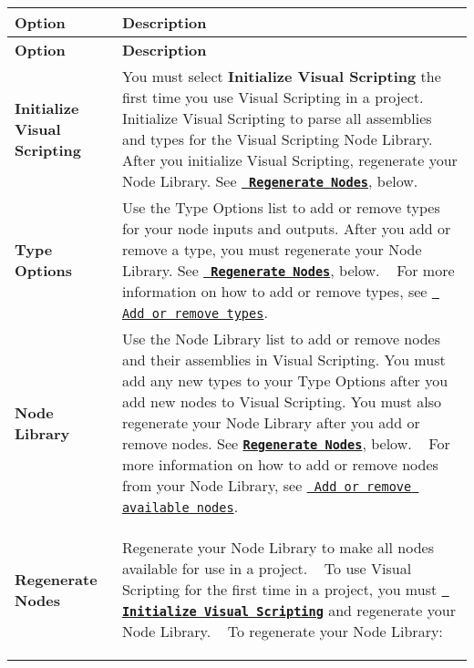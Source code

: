 \tabulinesep=1mm
\begin{longtabu}spread 0pt [c]{*{2}{|X[-1]}|}
\hline
\cellcolor{\tableheadbgcolor}\textbf{ {\bfseries{Option}} }&\cellcolor{\tableheadbgcolor}\textbf{ Description    }\\
\endfirsthead
\hline
\endfoot
\hline
\cellcolor{\tableheadbgcolor}\textbf{ {\bfseries{Option}} }&\cellcolor{\tableheadbgcolor}\textbf{ Description    }\\
\endhead
{\bfseries{\label{md__library_2_package_cache_2com_8unity_8visualscripting_0d1_89_82_2_documentation_0i_2vs-configuration_Initialize}%
%
Initialize Visual Scripting}} &You must select {\bfseries{Initialize Visual Scripting}} the first time you use Visual Scripting in a project. Initialize Visual Scripting to parse all assemblies and types for the Visual Scripting Node Library. After you initialize Visual Scripting, regenerate your Node Library. See {\bfseries{\href{\#Regen}{\texttt{ Regenerate Nodes}}}}, below.  \\
{\bfseries{Type Options}} &Use the Type Options list to add or remove types for your node inputs and outputs. After you add or remove a type, you must regenerate your Node Library. See {\bfseries{\href{\#Regen}{\texttt{ Regenerate Nodes}}}}, below. ~\newline
For more information on how to add or remove types, see \href{vs-add-remove-type-options.md}{\texttt{ Add or remove types}}.  \\
{\bfseries{Node Library}} &Use the Node Library list to add or remove nodes and their assemblies in Visual Scripting. You must add any new types to your Type Options after you add new nodes to Visual Scripting. You must also regenerate your Node Library after you add or remove nodes. See \href{\#Regen}{\texttt{ {\bfseries{Regenerate Nodes}}}}, below. ~\newline
For more information on how to add or remove nodes from your Node Library, see \href{vs-add-remove-node-library.md}{\texttt{ Add or remove available nodes}}.  \\
{\bfseries{\label{md__library_2_package_cache_2com_8unity_8visualscripting_0d1_89_82_2_documentation_0i_2vs-configuration_Regen}%
%
Regenerate Nodes}} &Regenerate your Node Library to make all nodes available for use in a project. ~\newline
To use Visual Scripting for the first time in a project, you must {\bfseries{\href{\#Initialize}{\texttt{ Initialize Visual Scripting}}}} and regenerate your Node Library. ~\newline
To regenerate your Node Library\+: 
\begin{DoxyEnumerate}
\item 


\end{DoxyEnumerate}
\end{longtabu}
